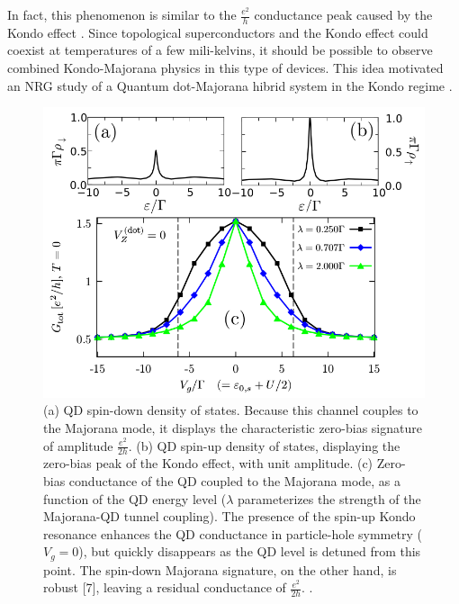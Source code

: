 In fact, this phenomenon is similar to the $\frac{e^{2}}{h}$ conductance peak caused by the Kondo effect \citep{hewson_kondo_1997}. Since topological superconductors and the Kondo effect could coexist at temperatures of a few mili-kelvins, it should be possible to observe combined Kondo-Majorana physics in this type of devices. This idea motivated an NRG study of a Quantum dot-Majorana hibrid system in the Kondo regime  \citep{ruiz-tijerina_interaction_2015}. \\

\begin{figure}[t]
    \centering
    \includegraphics[scale=0.4]{IMAGES/Kondo-MajoranaCond.png}
    \caption{\label{Fig-Kondo-Majorana conductance}(a) QD spin-down
    density of states. Because this channel couples to the Majorana mode,
    it displays the characteristic zero-bias signature of amplitude
    $\frac{e^{2}}{2h}$. (b) QD spin-up density of states,
    displaying the zero-bias peak of the Kondo effect, with
    unit amplitude. (c) Zero-bias conductance of the QD coupled
    to the Majorana mode, as a function of the QD energy level ($\lambda$
    parameterizes the strength of the Majorana-QD tunnel coupling).
    The presence of the spin-up Kondo resonance enhances the
    QD conductance in particle-hole symmetry ($V_{g}=0$),
    but quickly disappears as the QD level is detuned from this point.
    The spin-down Majorana signature, on the other hand, is
    robust {[}7{]}, leaving a residual conductance of $\frac{e^{2}}{2h}$.
    \protect{}.}
\end{figure}

